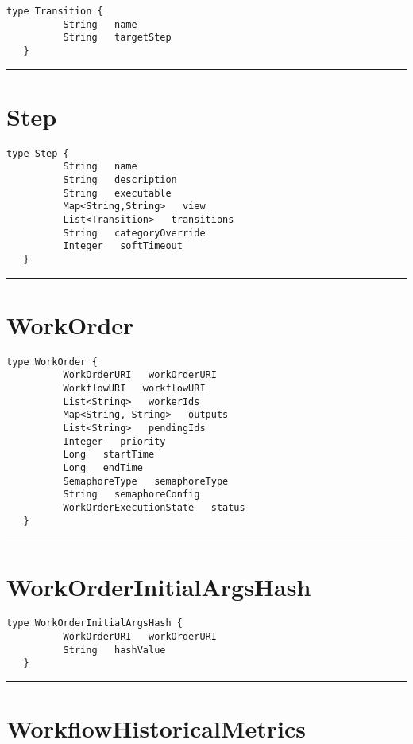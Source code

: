 \begin{lstlisting}[style=nonumbers]
   type Transition {
          String   name
          String   targetStep
   }
\end{lstlisting}

\rule{12cm}{2pt}
\section{Step}
\label{type:Step}

\begin{lstlisting}[style=nonumbers]
   type Step {
          String   name
          String   description
          String   executable
          Map<String,String>   view
          List<Transition>   transitions
          String   categoryOverride
          Integer   softTimeout
   }
\end{lstlisting}

\rule{12cm}{2pt}
\section{WorkOrder}
\label{type:WorkOrder}

\begin{lstlisting}[style=nonumbers]
   type WorkOrder {
          WorkOrderURI   workOrderURI
          WorkflowURI   workflowURI
          List<String>   workerIds
          Map<String, String>   outputs
          List<String>   pendingIds
          Integer   priority
          Long   startTime
          Long   endTime
          SemaphoreType   semaphoreType
          String   semaphoreConfig
          WorkOrderExecutionState   status
   }
\end{lstlisting}

\rule{12cm}{2pt}
\section{WorkOrderInitialArgsHash}
\label{type:WorkOrderInitialArgsHash}

\begin{lstlisting}[style=nonumbers]
   type WorkOrderInitialArgsHash {
          WorkOrderURI   workOrderURI
          String   hashValue
   }
\end{lstlisting}

\rule{12cm}{2pt}
\section{WorkflowHistoricalMetrics}
\label{type:WorkflowHistoricalMetrics}

